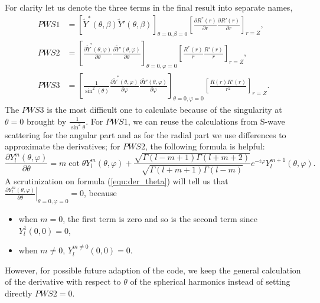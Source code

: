 \documentclass[british,english]{article}
\numberwithin{equation}{section}
\numberwithin{figure}{section}
\begin{document}
For clarity let us denote the three terms in the final result into separate names,
\begin{align}
PWS1&=\left[\tilde{Y}^*(\theta,\beta)\tilde{Y}'(\theta,\beta)\right]_{\theta=0,\beta=0}\left[\frac{\partial R^*(r)}{\partial r}\frac{\partial R'(r)}{\partial r}\right]_{r=Z},\\
PWS2&=\left[\frac{\partial \tilde{Y}^*(\theta,\varphi)}{\partial \theta}\frac{\partial \tilde{Y}'(\theta,\varphi)}{\partial \theta}\right]_{\theta=0,\varphi=0}\left[\frac{R^*(r)}{r}\frac{R'(r)}{r}\right]_{r=Z},\\
PWS3&=\left[\frac{1}{\sin^2(\theta)}\frac{\partial \tilde{Y}^*(\theta,\varphi)}{\partial \varphi}\frac{\partial \tilde{Y}'(\theta,\varphi)}{\partial \varphi}\right]_{\theta=0,\varphi=0}\left[\frac{R(r)R'(r)}{r^2}\right]_{r=Z}.
\end{align}
The $PWS3$ is the most difficult one to calculate because of the singularity at $\theta=0$ brought by $\frac{1}{\sin^2 \theta}$. For $PWS1$, we can reuse the calculations from S-wave scattering for the angular part and as for the radial part we use differences to approximate the derivatives; for $PWS2$, the following formula is helpful:
\begin{equation}
\frac{\partial Y_l^m(\theta,\varphi)}{\partial \theta}= m\cot \theta Y^m_l(\theta,\varphi) + \frac{\sqrt{\Gamma(l-m+1)\Gamma(l+m+2)}}{\sqrt{\Gamma(l+m+1)\Gamma(l-m)}}e^{-i\varphi}Y^{m+1}_l(\theta,\varphi).
\label{equ:der_theta}
\end{equation}
A scrutinization on formula (\ref{equ:der_theta}) will tell us that $\left.\frac{\partial Y_l^m(\theta,\varphi)}{\partial \theta}\right|_{\theta=0,\varphi=0}=0$, because
\begin{itemize}
\item when $m=0$, the first term is zero and so is the second term since $Y_l^1(0,0)=0$,
\item when $m\neq0$, $Y_l^{m\neq0}(0,0)=0$.
\end{itemize}
However, for possible future adaption of the code, we keep the general calculation of the derivative with respect to $\theta$ of the spherical harmonics instead of setting directly $PWS2=0$. 
\end{document}
